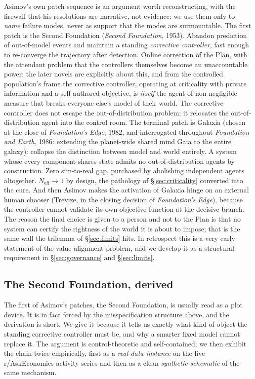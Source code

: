 \documentclass[11pt]{article}
\begin{document}
Asimov's own patch sequence is an argument worth reconstructing, with the firewall that his resolutions are narrative, not evidence: we use them only to \emph{name} failure modes, never as support that the modes are surmountable. The first patch is the Second Foundation (\emph{Second Foundation}, 1953). Abandon prediction of out-of-model events and maintain a standing \emph{corrective controller}, fast enough to re-converge the trajectory after detection. Online correction of the Plan, with the attendant problem that the controllers themselves become an unaccountable power; the later novels are explicitly about this, and from the controlled population's frame the corrective controller, operating at criticality with private information and a self-authored objective, is \emph{itself} the agent of non-negligible measure that breaks everyone else's model of their world. The corrective controller does not escape the out-of-distribution problem; it relocates the out-of-distribution agent into the control room. The terminal patch is Galaxia (chosen at the close of \emph{Foundation's Edge}, 1982, and interrogated throughout \emph{Foundation and Earth}, 1986: extending the planet-wide shared mind Gaia to the entire galaxy): collapse the distinction between model and world entirely. A system whose every component shares state admits no out-of-distribution agents by construction. Zero sim-to-real gap, purchased by abolishing independent agents altogether. $N_{\mathrm{eff}} \to 1$ by design, the pathology of \S\ref{sec:criticality} converted into the cure. And then Asimov makes the activation of Galaxia hinge on an external human chooser (Trevize, in the closing decision of \emph{Foundation's Edge}), because the controller cannot validate its own objective function at the decisive branch. The reason the final choice is given to a person and not to the Plan is that no system can certify the rightness of the world it is about to impose; that is the same wall the trilemma of \S\ref{sec:limits} hits. In retrospect this is a very early statement of the value-alignment problem, and we develop it as a structural requirement in \S\ref{sec:governance} and \S\ref{sec:limits}.

\subsection{The Second Foundation, derived}
\label{sec:secondfoundation}

The first of Asimov's patches, the Second Foundation, is usually read as a plot device. It is in fact forced by the misspecification structure above, and the derivation is short. We give it because it tells us exactly what kind of object the standing corrective controller must be, and why a smarter fixed model cannot replace it. The argument is control-theoretic and self-contained; we then exhibit the chain twice empirically, first as a \emph{real-data instance} on the live r/AskEconomics activity series and then as a clean \emph{synthetic schematic} of the same mechanism.
\end{document}
